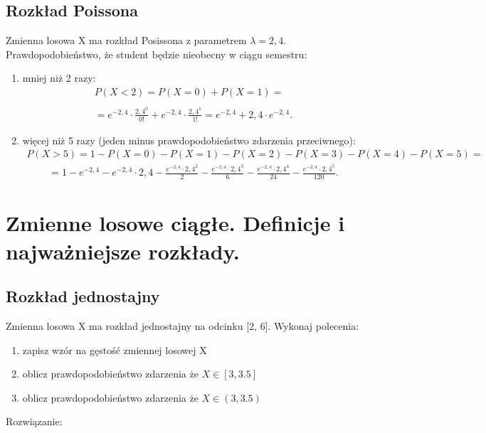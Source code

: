 \documentclass[main.tex]{subfiles}
\begin{document}
    \subsection{Rozkład Poissona}
    \begin{exercise}
        Zmienna losowa X ma rozkład Posissona z parametrem $\lambda = 2,4$. Prawdopodobieństwo, że student będzie nieobecny w ciągu semestru:
    \end{exercise}
    \begin{enumerate}
        \item mniej niż 2 razy:
        \begin{align*}
            P(X<2)=P(X=0)+P(X=1)=\\\\
            =e^{-2,4}\cdot\frac{2,4^0}{0!}+e^{-2,4}\cdot\frac{2,4^1}{1!}=e^{-2,4}+2,4\cdot e^{-2,4}.
        \end{align*}
        \item więcej niż 5 razy (jeden minus prawdopodobieństwo zdarzenia przeciwnego):
        \begin{align*}
            P(X>5)=1-P(X=0)-P(X=1)-P(X=2)-P(X=3)-P(X=4)-P(X=5)=
        \end{align*}
        \begin{align*}
            =1-e^{-2,4}-e^{-2,4}\cdot2,4-\frac{e^{-2,4}\cdot2,4^2}{2}-\frac{e^{-2,4}\cdot2,4^3}{6}-\frac{e^{-2,4}\cdot2,4^4}{24}-\frac{e^{-2,4}\cdot2,4^5}{120}.
        \end{align*}

    \end{enumerate}



    \newpage

    \section{Zmienne losowe ciągłe. Definicje i najważniejsze rozkłady.}

    \subsection{Rozkład jednostajny}
    \begin{exercise}
        Zmienna losowa X ma rozkład jednostajny na odcinku [2, 6]. Wykonaj
        polecenia:
        \begin{enumerate}
            \item zapisz wzór na gęstość zmiennej losowej X
            \item oblicz prawdopodobieństwo zdarzenia że $X\in[3,3.5]$
            \item oblicz prawdopodobieństwo zdarzenia że $X \in (3,3.5)$
        \end{enumerate}
    \end{exercise}
    Rozwiązanie:
\end{document}
